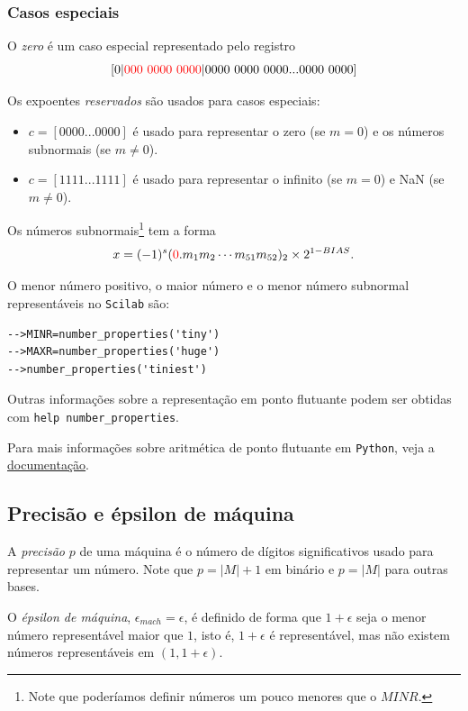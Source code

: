 \subsubsection{Casos especiais}
O \emph{zero} é um caso especial representado pelo registro 
$$
[0|{\color{red}{000~0000~0000}} |0000~0000~0000...0000~0000]
$$




Os expoentes \emph{reservados} são usados para casos especiais:
\begin{itemize}
 \item $c=[0000...0000]$ é usado para representar o zero (se $m=0$) e os números subnormais (se $m\neq 0$).
 \item $c=[1111...1111]$ é usado para representar o infinito (se $m=0$) e NaN (se $m\neq 0$).
\end{itemize}

Os números subnormais\footnote{Note que poderíamos definir números um pouco menores que o $MINR$.} tem a forma
$$ x=(-1)^{s}({\color{red}{0}}.m_{1}m_{2}\cdots m_{51}m_{52})_2 \times 2^{1-BIAS}.$$

\ifisscilab
\begin{obs}
  O menor número positivo, o maior número e o menor número subnormal representáveis  no \verb+Scilab+ são:
\begin{verbatim}
-->MINR=number_properties('tiny')
-->MAXR=number_properties('huge')
-->number_properties('tiniest')
\end{verbatim}
Outras informações sobre a representação em ponto flutuante podem ser obtidas com \verb+help number_properties+.
\end{obs}
\fi
\ifispython
Para mais informações sobre aritmética de ponto flutuante em \verb+Python+, veja a \href{https://docs.python.org/3/tutorial/floatingpoint.html?highlight=double}{documentação}.
\fi

\subsection{Precisão e épsilon de máquina}

A \emph{precisão} $p$ de uma máquina é o número de dígitos significativos usado para representar um número. Note que $p=|M|+1$ em binário e $p=|M|$ para outras bases.

O \emph{épsilon de máquina}, $\epsilon_{mach}=\epsilon$, é definido de forma que $1+\epsilon$ seja o menor número representável maior que $1$, isto é, $1+\epsilon$ é representável, mas não existem números representáveis em $(1, 1+\epsilon)$.

